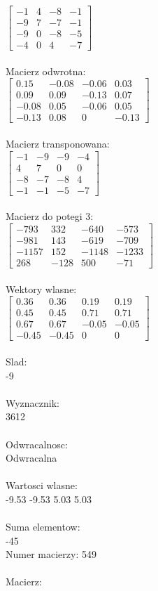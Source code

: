 \documentclass[a4paper,12pt]{article}
\begin{document}
$\begin{bmatrix} -1&4&-8&-1\\-9&7&-7&-1\\-9&0&-8&-5\\-4&0&4&-7 \end{bmatrix}$
\\
\\
Macierz odwrotna:\\

$\begin{bmatrix} 0.15&-0.08&-0.06&0.03\\0.09&0.09&-0.13&0.07\\-0.08&0.05&-0.06&0.05\\-0.13&0.08&0&-0.13 \end{bmatrix}$
\\
\\
Macierz transponowana:\\

$\begin{bmatrix} -1&-9&-9&-4\\4&7&0&0\\-8&-7&-8&4\\-1&-1&-5&-7 \end{bmatrix}$
\\
\\
Macierz do potegi 3:\\

$\begin{bmatrix} -793&332&-640&-573\\-981&143&-619&-709\\-1157&152&-1148&-1233\\268&-128&500&-71 \end{bmatrix}$
\\
\\
Wektory wlasne:\\

$\begin{bmatrix} 0.36&0.36&0.19&0.19\\0.45&0.45&0.71&0.71\\0.67&0.67&-0.05&-0.05\\-0.45&-0.45&0&0 \end{bmatrix}$
\\
\\
Slad:\\
-9
\\
\\
Wyznacznik:\\
3612
\\
\\
Odwracalnosc:\\
Odwracalna
\\
\\
Wartosci wlasne:\\
-9.53 -9.53 5.03 5.03
\\
\\
Suma elementow:\\
-45
\\
\newpage
Numer macierzy:
549
\\
\\
Macierz:\\
\end{document}
